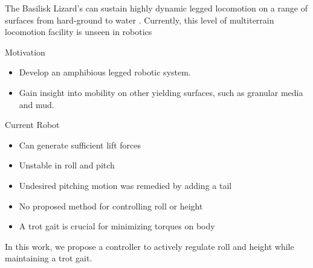 The Basilisk Lizard's can sustain highly dynamic legged locomotion on a range of surfaces from hard-ground to water \cite{glasheen1996hydrodynamic}. Currently, this level of multiterrain locomotion facility is unseen in robotics 
\vspace{1EX}

\textcolor{prime}{\textsf{Motivation}}
\begin{itemize}
    \item Develop an amphibious legged robotic system.
    \item Gain insight into mobility on other yielding surfaces, such as granular media and mud.
\end{itemize} 
\vspace{1EX}

\textcolor{prime}{\textsf{Current Robot~\cite{park2010roll}}}
\begin{itemize}
    \item Can generate sufficient lift forces
    \item Unstable in roll and pitch
    \item Undesired pitching motion was remedied by adding a tail
    \item No proposed method for controlling roll or height
    \item A trot gait is crucial for minimizing torques on body
\end{itemize}

\vspace{1EX}

In this work, we propose a controller to actively regulate roll and height while maintaining a trot gait.

